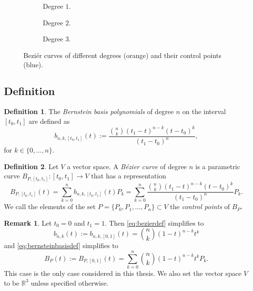\documentclass[a4paper, 11pt]{report}
\theoremstyle{definition}
\newtheorem{definition}{Definition}[section]
\newtheorem*{remark}{Remark}
\renewcommand{\emph}[1]{\textit{#1}}
\begin{document}
\begin{figure}[H]
	\centering
	\begin{subfigure}{0.25\textwidth}
		
		\caption{Degree $1$.}
	\end{subfigure}
	\begin{subfigure}{0.25\textwidth}
		
		\caption{Degree $2$.}
	\end{subfigure}
	\begin{subfigure}{0.25\textwidth}
		
		\caption{Degree $3$.}
	\end{subfigure}
	\caption{Beziér curves of different degrees (orange) and their control points (blue).}
\end{figure}

\subsection{Definition}
\begin{definition}
	The \emph{Bernstein basis polynomials} of degree $n$ on the interval $[t_0,t_1]$ are defined as
	\begin{equation}\label{eq:bernsteinbasisdef}
		b_{n,k,[t_0, t_1]}(t) := \frac{\binom{n}{k} (t_1-t)^{n-k}(t-t_0)^k}{(t_1-t_0)^n},
	\end{equation}
	for $k \in \{0,\dots, n\}$.
\end{definition}

\begin{definition}
	Let $V$ a vector space. A \emph{Bézier curve} of degree $n$ is a parametric curve $B_{P,[t_0, t_1]}: [t_0, t_1] \rightarrow V$ that has a representation
	\begin{equation}\label{eq:bezierdef}
		B_{P, [t_0, t_1]}(t) = \sum_{k=0}^n b_{n,k,[t_0, t_1]}(t) P_k = \sum_{k=0}^n \frac{\binom{n}{k} (t_1-t)^{n-k}(t-t_0)^k}{(t_1-t_0)^n} P_k.
	\end{equation}
	We call the elements of the set $P = \{P_0, P_1, \dots, P_n\} \subset V$ the \emph{control points} of $B_P$.
\end{definition}

\begin{remark}
	Let $t_0 = 0$ and $t_1 = 1$. Then \ref{eq:bezierdef} simplifies to
	\begin{equation}
		b_{n,k}(t) := b_{n,k,[0,1]}(t) = \binom{n}{k} (1-t)^{n-k}t^k
	\end{equation}
	and \ref{eq:bernsteinbasisdef} simplifies to
	\begin{equation}\label{eq:bezierdefshort}
		B_P(t) := B_{P,[0,1]}(t)= \sum_{k=0}^n \binom{n}{k} (1-t)^{n-k}t^k P_k.
	\end{equation}
	This case is the only case considered in this thesis. We also set the vector space $V$ to be $\mathbb{R}^3$ unless specified otherwise.
\end{remark}
\end{document}
